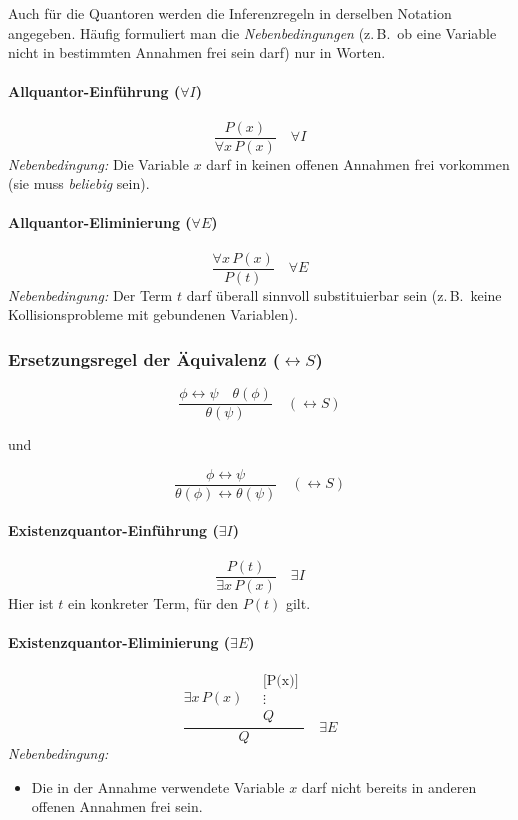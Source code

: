 \documentclass[main.tex]{subfiles}
\begin{document}
Auch für die Quantoren werden die Inferenzregeln in derselben Notation angegeben. Häufig formuliert man die \emph{Nebenbedingungen} (z.\,B.\ ob eine Variable nicht in bestimmten Annahmen frei sein darf) nur in Worten.

\paragraph{Allquantor-Einführung ($\forall I$)}
\[
\frac{P(x)}{\forall x\,P(x)}
\quad \forall I
\]
\emph{Nebenbedingung:} Die Variable $x$ darf in keinen offenen Annahmen frei vorkommen (sie muss \emph{beliebig} sein).

\paragraph{Allquantor-Eliminierung ($\forall E$)}
\[
\frac{\forall x\,P(x)}{P(t)}
\quad \forall E
\]
\emph{Nebenbedingung:} Der Term $t$ darf überall sinnvoll substituierbar sein (z.\,B.\ keine Kollisionsprobleme mit gebundenen Variablen).

\subsubsection{Ersetzungsregel der Äquivalenz ($\leftrightarrow S$)}

\[
\frac{
  \phi \leftrightarrow \psi 
  \quad
  \theta(\phi)
}{
  \theta(\psi)
}
\quad (\leftrightarrow S)
\]

und

\[
\frac{
  \phi \leftrightarrow \psi
}{
  \theta(\phi)\leftrightarrow \theta(\psi)
}
\quad (\leftrightarrow S)
\]



\paragraph{Existenzquantor-Einführung ($\exists I$)}
\[
\frac{P(t)}{\exists x\,P(x)}
\quad \exists I
\]
Hier ist $t$ ein konkreter Term, für den $P(t)$ gilt.

\paragraph{Existenzquantor-Eliminierung ($\exists E$)}
\[
\frac{
\exists x\,P(x) 
\quad
\begin{array}{c}
\text{[P(x)]}\\
\vdots \\
Q
\end{array}
}{Q}
\quad \exists E
\]
\emph{Nebenbedingung:}
\begin{itemize}
    \item Die in der Annahme verwendete Variable $x$ darf nicht bereits in anderen offenen Annahmen frei sein.
\end{itemize}
\end{document}
